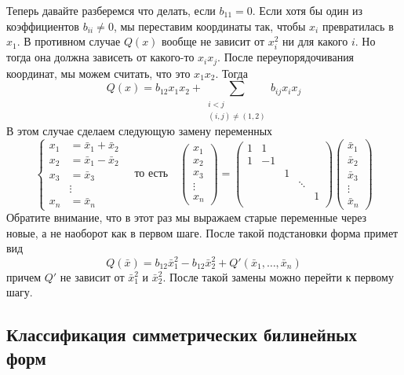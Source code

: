 Теперь давайте разберемся что делать, если $b_{11} = 0$. Если хотя бы один из коэффициентов $b_{ii}\neq 0$, мы переставим координаты так, чтобы $x_i$ превратилась в $x_1$. В противном случае $Q(x)$ вообще не зависит от $x_i^2$ ни для какого $i$. Но тогда она должна зависеть от какого-то $x_i x_j$. После переупорядочивания координат, мы можем считать, что это $x_1x_2$. Тогда
\[
Q(x) = b_{12}x_1 x_2 + \sum_{\substack{i < j\\ (i, j)\neq (1, 2)}} b_{ij}x_i x_j
\]
В этом случае сделаем следующую замену переменных
\[
\left\{
\begin{aligned}
x_1 &= \bar x_1 + \bar x_2\\
x_2 &= \bar x_1 - \bar x_2\\
x_3 &= \bar x_3\\
&\vdots\\
x_n &= \bar x_n
\end{aligned}
\right.
\quad\text{то есть}\quad
\begin{pmatrix}
{x_1}\\{x_2}\\{x_3}\\{\vdots}\\{x_n}
\end{pmatrix}
=
\begin{pmatrix}
{1}&{1}&{}&{}&{}\\
{1}&{-1}&{}&{}&{}\\
{}&{}&{1}&{}&{}\\
{}&{}&{}&{\ddots}&{}\\
{}&{}&{}&{}&{1}\\
\end{pmatrix}
\begin{pmatrix}
{\bar x_1}\\{\bar x_2}\\{\bar x_3}\\{\vdots}\\{\bar x_n}
\end{pmatrix}
\]
Обратите внимание, что в этот раз мы выражаем старые переменные через новые, а не наоборот как в первом шаге. После такой подстановки форма примет вид
\[
Q(\bar x) = b_{12}\bar x_1^2 - b_{12}\bar x_2^2 + Q'(\bar x_1,\ldots,\bar x_n)
\]
причем $Q'$ не зависит от $\bar x_1^2$ и $\bar x_2^2$. После такой замены можно перейти к первому шагу. 



\subsection{Классификация симметрических билинейных форм}

